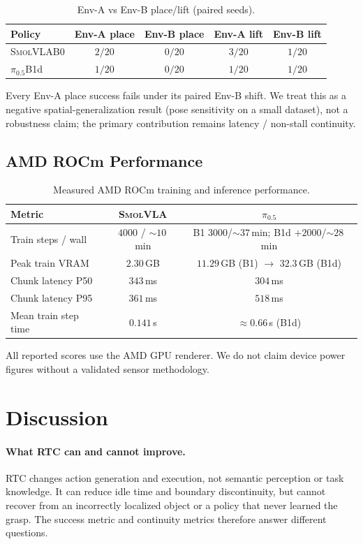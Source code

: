 \documentclass[10pt,twocolumn]{article}
\newcommand{\pifive}{$\pi_{0.5}$}
\newcommand{\smolvla}{\textsc{SmolVLA}}
\begin{document}
\begin{table}[t]
\centering
\caption{Env-A vs Env-B place/lift (paired seeds).}
\label{tab:envb}
\small
\begin{tabular}{lcccc}
\toprule
Policy & Env-A place & Env-B place & Env-A lift & Env-B lift \\
\midrule
\smolvla B0 & $2/20$ & $0/20$ & $3/20$ & $1/20$ \\
\pifive B1d & $1/20$ & $0/20$ & $1/20$ & $1/20$ \\
\bottomrule
\end{tabular}
\end{table}

Every Env-A place success fails under its paired Env-B shift. We treat this as
a negative spatial-generalization result (pose sensitivity on a small dataset),
not a robustness claim; the primary contribution remains latency / non-stall
continuity.

\subsection{AMD ROCm Performance}

\begin{table}[t]
\centering
\caption{Measured AMD ROCm training and inference performance.}
\label{tab:amd}
\small
\begin{tabular}{lcc}
\toprule
Metric & \smolvla & \pifive \\
\midrule
Train steps / wall & $4000$ / $\sim10$\,min & B1 $3000$/$\sim37$\,min; B1d $+2000$/$\sim28$\,min \\
Peak train VRAM & $2.30$\,GB & $11.29$\,GB (B1) $\rightarrow$ $32.3$\,GB (B1d) \\
Chunk latency P50 & $343$\,ms & $304$\,ms \\
Chunk latency P95 & $361$\,ms & $518$\,ms \\
Mean train step time & $0.141$\,s & $\approx0.66$\,s (B1d) \\
\bottomrule
\end{tabular}
\end{table}

All reported scores use the AMD GPU renderer. We do not claim device power
figures without a validated sensor methodology.

\section{Discussion}

\paragraph{What RTC can and cannot improve.}
RTC changes action generation and execution, not semantic perception or task
knowledge.  It can reduce idle time and boundary discontinuity, but cannot
recover from an incorrectly localized object or a policy that never learned
the grasp.  The success metric and continuity metrics therefore answer
different questions.
\end{document}

